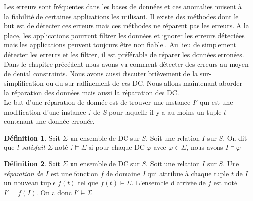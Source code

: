 \documentclass[letterpaper, 12pt]{report}
\theoremstyle{definition}
\newtheorem{mydef}{Définition}
\begin{document}
Les erreurs sont fréquentes dans les bases de données et ces anomalies nuisent à la fiabilité de certaines applications les utilisant. Il existe des méthodes dont le but est de détecter ces erreurs mais ces méthodes ne réparent pas les erreurs. A la place, les applications pourront filtrer les données et ignorer les erreurs détectées mais les applications peuvent toujours être non fiable \cite{anodetect}. Au lieu de simplement détecter les erreurs et les filtrer, il est préférable de réparer les données erronées.\\

Dans le chapitre précédent nous avons vu comment détecter des erreurs au moyen de denial constraints. Nous avons aussi discuter brièvement de la sur-simplification ou du sur-raffinement de ces DC. Nous allons maintenant aborder la réparation des données mais aussi la réparation des DC.\\

%

Le but d'une réparation de donnée est de trouver une instance $I'$ qui est une modification d'une instance $I$ de $S$ pour laquelle il y a au moins un tuple $t$ contenant une donnée erronée.\\

\begin{mydef}
	Soit $\Sigma$ un ensemble de DC sur $S$. Soit une relation $I$ sur $S$. On dit que $I$ \emph{satisfait} $\Sigma$ noté $I \models \Sigma$ si pour chaque DC $\varphi$ avec $\varphi \in \Sigma$, nous avons $I \models \varphi$
\end{mydef}

\begin{mydef}
	Soit $\Sigma$ un ensemble de DC sur $S$. Soit une relation $I$ sur $S$. Une \emph{réparation de $I$} est une fonction $f$ de domaine $I$ qui attribue à chaque tuple $t$ de $I$ un nouveau tuple $f(t)$ tel que $f(t) \models \Sigma$. L'ensemble d'arrivée de $f$ est noté $I'=f(I)$. On a donc $I' \models \Sigma$
\end{mydef}
\end{document}
